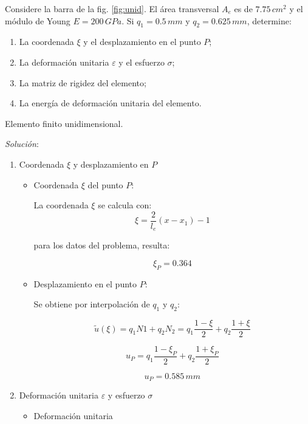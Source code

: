 \begin{example}
	Considere la barra de la fig. \ref{fig:unid}. El área transversal $A_e$ es de $7.75 \, \unit{cm^2}$ y el módulo de Young $E = 200 \, \unit{GPa}$. Si $q_1 = 0.5 \, \unit{mm}$ y $q_2 = 0.625 \, \unit{mm}$, determine:

\begin{enumerate}[noitemsep]
	\item La coordenada $\xi$ y el desplazamiento en el punto $P$;
	\item La deformación unitaria $\varepsilon$ y el esfuerzo $\sigma$;
	\item La matriz de rigidez del elemento;
	\item La energía de deformación unitaria del elemento.
\end{enumerate}

\begin{marginfigure}[-3cm]
	\centering
	
	\caption{Elemento finito unidimensional.}
	\label{fig:unid}
\end{marginfigure}

\textit{Solución}:
\vspace{2mm}

\begin{enumerate}[label=\textbf{\arabic*}.]
	\item Coordenada $\xi$ y desplazamiento en $P$
	\begin{itemize}
		\item Coordenada $\xi$ del punto $P$:
		
		La coordenada $\xi$ se calcula con: $$\xi = \dfrac{2}{l_e} \left( x - x_1 \right) - 1$$
		
		para los datos del problema, resulta:
		
		$$\boxed{\xi_P = 0.364}$$
		
		\item Desplazamiento en el punto $P$:
		
		Se obtiene por interpolación de $q_1$ y $q_2$:
		
		$$
		\tilde{u}(\xi) = q_1 N1 + q_2 N_2 = q_1 \dfrac{1-\xi}{2} + q_2 \dfrac{1+\xi}{2} 
		$$
		
		$$
		u_P = q_1 \dfrac{1-\xi_P}{2} + q_2 \dfrac{1+\xi_P}{2}
		$$
		
		$$
		\boxed{u_P = 0.585 \, \unit{mm}}
		$$
	\end{itemize}

\item Deformación unitaria $\varepsilon$ y esfuerzo $\sigma$
\begin{itemize}
	\item Deformación unitaria
	

\end{itemize}
\end{enumerate}
\end{example}

